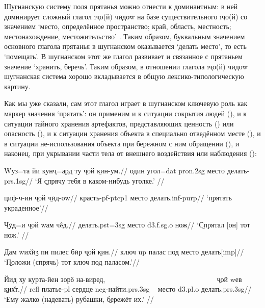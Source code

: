 Шугнанскую систему поля прятанья можно отнести к доминантным: в ней доминирует сложный глагол \i{ҷо(й) чӣдоw} на базе существительного \i{ҷо(й)} со значением ‘место, определённое пространство; край, область, местность; местонахождение, местожительство’ \parencite[556]{karamshoev1999}. Таким образом, буквальным значением основного глагола прятанья в шугнанском оказывается ‘делать место’, то есть ‘помещать’. В шугнанском этот же глагол развивает и связанное с прятаньем значение ‘хранить, беречь’. Таким образом, в отношении глагола \i{ҷо(й) чӣдоw} шугнанская система хорошо вкладывается в общую лексико-типологическую картину.

Как мы уже сказали, сам этот глагол играет в шугнанском ключевую роль как маркер значения ‘прятать’: он применим и к ситуации сокрытия людей (), и к ситуации тайного хранения артефактов, представляющих ценность () или опасность (), и к ситуации хранения объекта в специально отведённом месте (), и в ситуации не-использования объекта при бережном с ним обращении (), и наконец, при укрывании части тела от внешнего воздействия или наблюдения ():

\begingl
\gla Wуз=та йи кунҷ=ард ту \b{ҷой} \b{кин-ум}.//
 один угол={\sc dat} {\sc pron.2sg} место делать-{\sc prs.1sg}//
\glft ‘Я \b{спрячу} тебя в каком-нибудь уголке.’ //
\endgl \xe

\begingl
\gla циф-ч-ин \b{ҷой} \b{чӣд-оw}//
\glc красть-{\sc pf-ptcp1} место делать.{\sc inf-purp}//
\glft ‘\b{прятать} украденное’//
\endgl \xe

\begingl
\gla \b{Чӯд}=и \b{ҷой} wам чêд.//
\glc делать.{\sc pst=3sg} место {\sc d3.f.sg.o} нож//
\glft ‘\b{Спрятал} [он] тот нож.’ //
\endgl \xe

\begingl
\gla Дам wих̌ӣӡ пи пилес бӣр \b{ҷой} \b{кин}.//
 ключ {\sc up} палас под место делать[{\sc imp}]//
\glft ‘\b{Положи} (спрячь) тот ключ под паласом.’//
\endgl \xe

\begingl
\gla Йид ху курта-йен зорδ на-виред, ~~~~~~~~~~~~~~~~~~~~~~~~~~~~~~ \b{ҷой} wев \b{ких̌т}.//
 {\sc refl} платье-{\sc pl} сердце {\sc neg}-найти.{\sc prs.3sg} ~ место {\sc d3.pl.o} делать.{\sc prs.3sg}//
\glft ‘Ему жалко (надевать) рубашки, \b{бережёт} их.’ //
\endgl \xe

